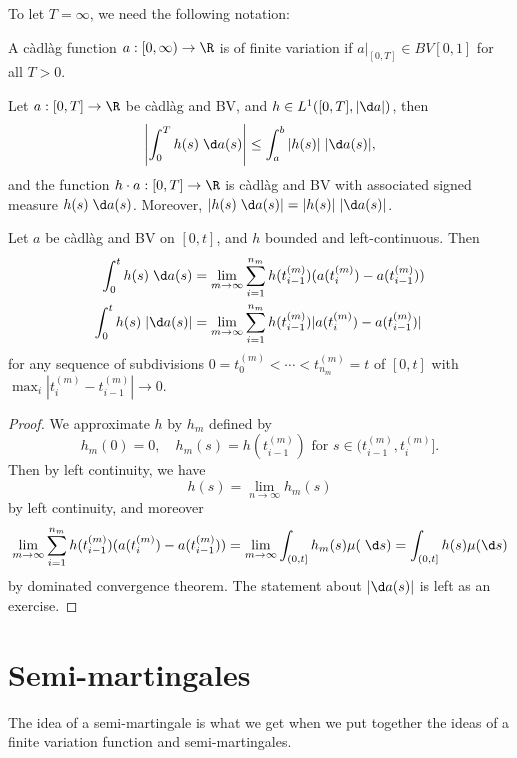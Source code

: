 \documentclass[a4paper]{article}
\begin{document}
To let $T = \infty$, we need the following notation:
\begin{defi}
  A c\`adl\`ag function $a: [0, \infty) \to \R$ is of finite variation if $a|_{[0, T]} \in BV[0, 1]$ for all $T > 0$.
\end{defi}

\begin{fact}
  Let $a: [0, T] \to \R$ be c\`adl\`ag and BV, and $h \in L^1([0, T], |\d a|)$, then
  \[
    \left|\int_0^T h(s) \;\d a (s) \right| \leq \int_a^b |h(s)|\;|\d a(s)|,
  \]
  and the function $h \cdot a: [0, T] \to \R$ is c\`adl\`ag and BV with associated signed measure $h(s) \;\d a(s)$. Moreover, $|h(s) \;\d a(s)| = |h(s)|\;|\d a(s)|$.
\end{fact}

\begin{prop}
  Let $a$ be c\`adl\`ag and BV on $[0, t]$, and $h$ bounded and left-continuous. Then
  \begin{align*}
    \int_0^t h(s) \;\d a(s) &= \lim_{m \to \infty} \sum_{i = 1}^{n_m} h(t_{i - 1}^{(m)}) (a (t_i^{(m)}) - a(t_{i - 1}^{(m)}))\\
    \int_0^t h(s) \;|\d a(s)| &= \lim_{m \to \infty} \sum_{i = 1}^{n_m} h(t_{i - 1}^{(m)}) |a (t_i^{(m)}) - a(t_{i - 1}^{(m)})|
  \end{align*}
  for any sequence of subdivisions $0 = t_0^{(m)} < \cdots < t_{n_m}^{(m)} = t$ of $[0, t]$ with $\max_i |t_i^{(m)} - t_{i - 1}^{(m)}| \to 0$.
\end{prop}

\begin{proof}
  We approximate $h$ by $h_m$ defined by
  \[
    h_m(0) = 0,\quad h_m(s) = h(t_{i - 1}^{(m)})\text{ for }s \in (t_{i - 1}^{(m)}, t_i^{(m)}].
  \]
  Then by left continuity, we have
  \[
    h(s) = \lim_{n \to \infty}h_m(s)
  \]
  by left continuity, and moreover
  \[
    \lim_{m \to \infty} \sum_{i = 1}^{n_m} h(t_{i - 1}^{(m)}) (a(t_i^{(m)}) - a(t_{i - 1}^{(m)})) = \lim_{m \to \infty} \int_{(0, t]} h_m(s) \mu (\;\d s) = \int_{(0, t]} h(s) \mu(\d s)
  \]
  by dominated convergence theorem. The statement about $|\d a(s)|$ is left as an exercise.
\end{proof}

\section{Semi-martingales}
The idea of a semi-martingale is what we get when we put together the ideas of a finite variation function and semi-martingales.
\end{document}
